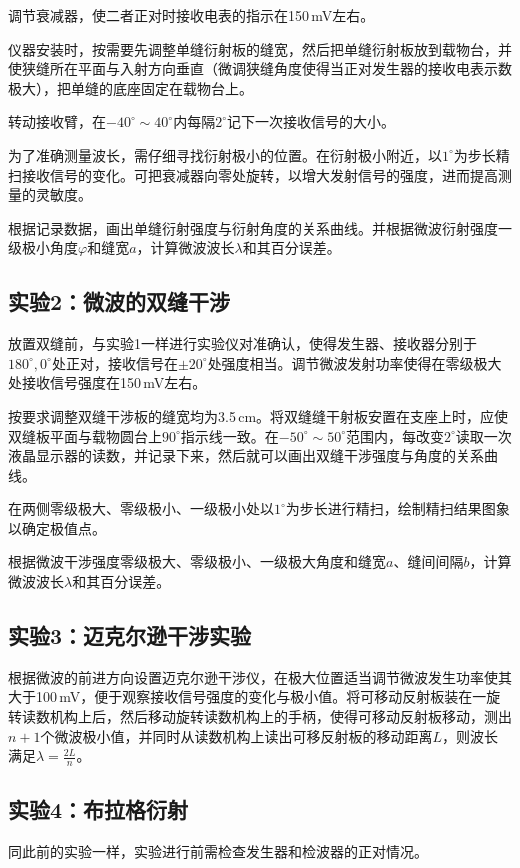 \documentclass[UTF8]{article}
\theoremstyle{MyLineTheoremStyle} %
\theoremstyle{MyBlockTheoremStyle} %
\theoremstyle{MySubsubsectionStyle} %
\begin{document}
调节衰减器，使二者正对时接收电表的指示在150\,mV左右。

仪器安装时，按需要先调整单缝衍射板的缝宽，然后把单缝衍射板放到载物台，并使狭缝所在平面与入射方向垂直（微调狭缝角度使得当正对发生器的接收电表示数极大），把单缝的底座固定在载物台上。

转动接收臂，在$ -40^\circ\sim40^\circ $内每隔$ 2^\circ $记下一次接收信号的大小。

为了准确测量波长，需仔细寻找衍射极小的位置。在衍射极小附近，以$ 1^\circ $为步长精扫接收信号的变化。可把衰减器向零处旋转，以增大发射信号的强度，进而提高测量的灵敏度。

根据记录数据，画出单缝衍射强度与衍射角度的关系曲线。并根据微波衍射强度一级极小角度$ \varphi $和缝宽$a$，计算微波波长$\lambda$和其百分误差。

\subsection{实验2：微波的双缝干涉}
放置双缝前，与实验1一样进行实验仪对准确认，使得发生器、接收器分别于$ 180^\circ,0^\circ $处正对，接收信号在$ \pm20^\circ $处强度相当。调节微波发射功率使得在零级极大处接收信号强度在150\,mV左右。

按要求调整双缝干涉板的缝宽均为3.5\,cm。将双缝缝干射板安置在支座上时，应使双缝板平面与载物圆台上$ 90^\circ $指示线一致。在$ -50^\circ\sim50^\circ $范围内，每改变$ 2^\circ $读取一次液晶显示器的读数，并记录下来，然后就可以画出双缝干涉强度与角度的关系曲线。

在两侧零级极大、零级极小、一级极小处以$ 1^\circ $为步长进行精扫，绘制精扫结果图象以确定极值点。

根据微波干涉强度零级极大、零级极小、一级极大角度和缝宽$a$、缝间间隔$ b $，计算微波波长$\lambda$和其百分误差。

\subsection{实验3：迈克尔逊干涉实验}
根据微波的前进方向设置迈克尔逊干涉仪，在极大位置适当调节微波发生功率使其大于100\,mV，便于观察接收信号强度的变化与极小值。将可移动反射板装在一旋转读数机构上后，然后移动旋转读数机构上的手柄，使得可移动反射板移动，测出$ n+1 $个微波极小值，并同时从读数机构上读出可移反射板的移动距离$ L $，则波长满足$ \lambda=\frac{2L}{n} $。

\subsection{实验4：布拉格衍射}
同此前的实验一样，实验进行前需检查发生器和检波器的正对情况。
\end{document}
